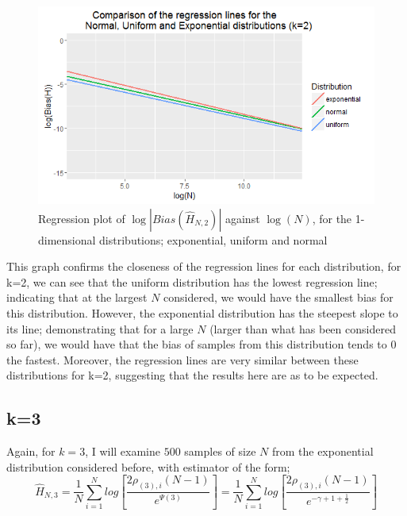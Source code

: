 \documentclass{report}
\begin{document}
\begin{figure}
  \begin{center}
    \includegraphics[width=\textwidth]{./Graphs/EUN_k=2_plot.png}
  \end{center}
\caption{Regression plot of $\log|Bias(\hat{H}_{N, 2})|$ against $\log(N)$, for the 1-dimensional distributions; exponential, uniform and normal}
  \label{E_U_N_k=2_graph}
\end{figure}

This graph confirms the closeness of the regression lines for each distribution, for k=2, we can see that the uniform distribution has the lowest regression line; indicating that at the largest $N$ considered, we would have the smallest bias for this distribution. However, the exponential distribution has the steepest slope to its line; demonstrating that for a large $N$ (larger than what has been considered so far), we would have that the bias of samples from this distribution tends to 0 the fastest. Moreover, the regression lines are very similar between these distributions for k=2, suggesting that the results here are as to be expected.




\subsection{k=3} \label{E_k=3}
Again, for $k=3$, I will examine $500$ samples of size $N$ from the exponential distribution considered before, with estimator of the form;
\begin{equation}
\hat{H}_{N, 3} = \frac{1}{N} \sum_{i=1}^{N} log \left[ \frac{2\rho_{(3),i} (N-1)}{e^{\Psi(3)}} \right] = \frac{1}{N} \sum_{i=1}^{N} log \left[ \frac{2\rho_{(3),i} (N-1)}{e^{-\gamma + 1 + \frac{1}{2}}} \right] \nonumber
\end{equation}
\end{document}
